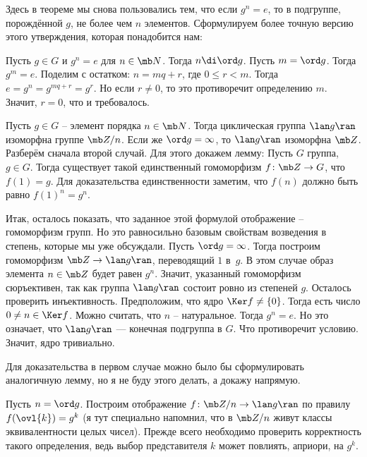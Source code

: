 Здесь в теореме мы снова пользовались тем, что если $g^n=e$, то в подгруппе, порождённой $g$, не более чем $n$ элементов. Сформулируем более точную версию этого утверждения, которая понадобится нам:

\utv Пусть $g\in  G$ и $g^n=e$ для $n\in \mb N$. Тогда $n \di \ord g$.
\eutv
\proof Пусть $m=\ord g$. Тогда $g^m=e$. Поделим с остатком: $n=mq+r$, где $0\leq r < m$. Тогда $e=g^n=g^{mq+r}=g^r$. Но если $r\neq 0$, то это противоречит определению $m$. Значит, $r=0$, что и требовалось.
\endproof









\thrm Пусть $g\in G$ -- элемент порядка $n\in \mb N$. Тогда циклическая группа $\lan g \ran $ изоморфна группе $\mb Z/n$. Если же $\ord g = \infty$, то $\lan g \ran$ изоморфна $\mb Z$.
\ethrm
{} Разберём сначала второй случай. Для этого докажем лемму: 
\lm Пусть $G$ группа, $g\in G$. Тогда существует такой единственный гомоморфизм $f \colon \mb Z \to G$, что $f(1)=g$.
\elm
\proof Для доказательства единственности заметим, что $f(n)$ должно быть равно $f(1)^n=g^n$. 

Итак, осталось показать, что заданное этой формулой отображение --  гомоморфизм групп. Но это равносильно базовым свойствам возведения в степень, которые мы уже обсуждали.
\endproof
{}
Пусть $\ord g=\infty$. Тогда построим гомоморфизм $\mb Z \to \lan g \ran$, переводящий $1$ в~$g$. В этом случае образ элемента $n \in \mb Z$ будет равен $g^n$. Значит, указанный гомоморфизм сюръективен, так как группа $\lan g \ran$ состоит ровно из степеней $g$. Осталось проверить инъективность. Предположим, что ядро $\Ker f \neq \{0\}$. Тогда есть число $0\neq n \in\Ker f $. Можно считать, что $n$ -- натуральное. Тогда $g^n=e$. Но это означает, что $\lan g \ran$ --- конечная подгруппа в $G$. Что противоречит условию. Значит, ядро тривиально.


Для доказательства в первом случае можно было бы сформулировать аналогичную лемму, но я не буду этого делать, а докажу напрямую.

Пусть $n=\ord g$. Построим отображение $f \colon\mb Z/n \to \lan g\ran $ по правилу $f(\ovl{k})=g^k$ (я тут специально напомнил, что в $\mb Z/n$ живут классы эквивалентности целых чисел).  Прежде всего необходимо проверить корректность такого определения, ведь выбор представителя $k$ может повлиять, априори, на $g^k$. 


